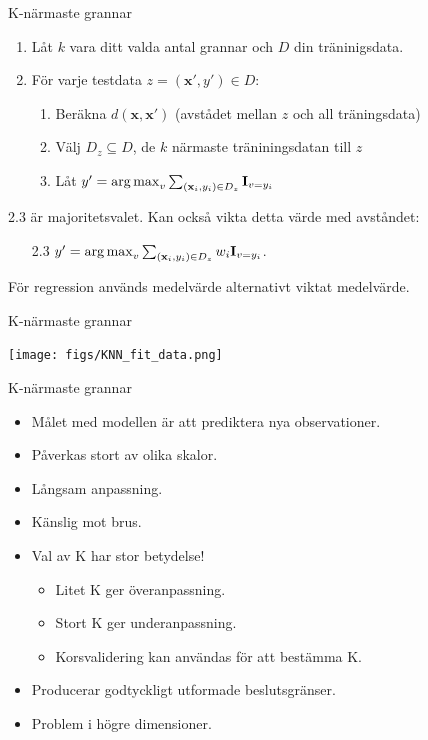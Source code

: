 \documentclass[10pt,english]{beamer}
\begin{document}
\begin{frame}{K-närmaste grannar}
    \begin{enumerate}
        \item Låt $k$ vara ditt valda antal grannar och $D$ din träninigsdata.
        \item För varje testdata $z = (\mathbf{x}', y') \in D$:
        \begin{enumerate}
            \item Beräkna $d(\mathbf{x},\mathbf{x}')$ (avstådet mellan $z$ och all träningsdata)
            \item Välj $D_z \subseteq D$, de $k$ närmaste träniningsdatan till $z$
            \item Låt $y' = \operatorname*{arg\,max}_v \sum_{(\mathbf{x}_i, y_i) \in D_z} \mathbf{I}_{v = y_i}$
        \end{enumerate}
    \end{enumerate}
    2.3 är majoritetsvalet. Kan också vikta detta värde med avståndet:
    \begin{itemize}
        \item[2.3] $y' = \operatorname*{arg\,max}_{v} \sum_{(\mathbf{x}_i, y_i) \in D_z} w_i \mathbf{I}_{v = y_i}$. 
    \end{itemize}

    För regression används medelvärde alternativt viktat medelvärde.
\end{frame}

\begin{frame}{K-närmaste grannar}

    \texttt{[image: figs/KNN\_fit\_data.png]}
    
\end{frame}

\begin{frame}{K-närmaste grannar}

    \begin{itemize}
        \item Målet med modellen är att prediktera nya observationer.
        \item Påverkas stort av olika skalor.
        \item Långsam anpassning.
        \item Känslig mot brus.
        \item Val av K har stor betydelse!
        \begin{itemize}
            \item Litet K ger överanpassning.
            \item Stort K ger underanpassning.
            \item Korsvalidering kan användas för att bestämma K.
        \end{itemize}
        \item Producerar godtyckligt utformade beslutsgränser.
        \item Problem i högre dimensioner.
    \end{itemize}
    
\end{frame}
\end{document}
